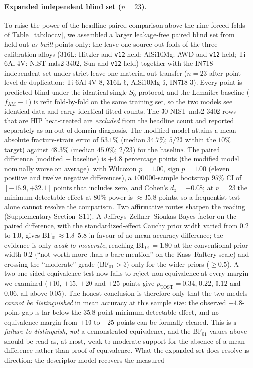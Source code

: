 \documentclass[twocolumn]{sagej}
\begin{document}
\paragraph{Expanded independent blind set ($n = 23$).} To raise the power of the headline paired comparison above the nine forced folds of Table~\ref{tab:loocv}, we assembled a larger leakage-free paired blind set from held-out \emph{as-built} points only: the leave-one-source-out folds of the three calibration alloys (316L: Hitzler and \texttt{v12}-held; AlSi10Mg: AWD and \texttt{v12}-held; Ti-6Al-4V: NIST mds2-3402, Sun and \texttt{v12}-held) together with the IN718 independent set under strict leave-one-material-out transfer ($n = 23$ after point-level de-duplication: Ti-6Al-4V 8, 316L 6, AlSi10Mg 6, IN718 3). Every point is predicted blind under the identical single-$S_0$ protocol, and the Lemaitre baseline ($f_{\mathrm{AM}} \equiv 1$) is refit fold-by-fold on the same training set, so the two models see identical data and carry identical fitted counts. The 30 NIST mds2-3402 rows that are HIP heat-treated are \emph{excluded} from the headline count and reported separately as an out-of-domain diagnosis. The modified model attains a mean absolute fracture-strain error of $53.1\%$ (median $34.7\%$; $5/23$ within the $10\%$ target) against $48.3\%$ (median $45.0\%$; $2/23$) for the baseline. The paired difference (modified $-$ baseline) is $+4.8$ percentage points (the modified model nominally worse on average), with Wilcoxon $p = 1.00$, sign $p = 1.00$ (eleven positive and twelve negative differences), a $100\,000$-sample bootstrap $95\%$ CI of $[-16.9, +32.1]$ points that includes zero, and Cohen's $d_z = +0.08$; at $n = 23$ the minimum detectable effect at $80\%$ power is $\approx 35.8$ points, so a frequentist test alone cannot resolve the comparison. Two affirmative routes sharpen the reading (Supplementary Section~S11). A Jeffreys--Zellner--Sioukas Bayes factor on the paired difference, with the standardized-effect Cauchy prior width varied from $0.2$ to $1.0$, gives $\mathrm{BF}_{01}\approx1.8$--$5.8$ in favour of no mean-accuracy difference; the evidence is only \emph{weak-to-moderate}, reaching $\mathrm{BF}_{01}=1.80$ at the conventional prior width $0.2$ (``not worth more than a bare mention'' on the Kass--Raftery scale) and crossing the ``moderate'' grade ($\mathrm{BF}_{01}>3$) only for the wider priors ($\ge0.5$). A two-one-sided equivalence test now fails to reject non-equivalence at every margin we examined ($\pm10$, $\pm15$, $\pm20$ and $\pm25$ points give $p_{\mathrm{TOST}}=0.34$, $0.22$, $0.12$ and $0.06$, all above $0.05$). The honest conclusion is therefore only that the two models \emph{cannot be distinguished} in mean accuracy at this sample size: the observed $+4.8$-point gap is far below the $35.8$-point minimum detectable effect, and no equivalence margin from $\pm10$ to $\pm25$ points can be formally cleared. This is a \emph{failure to distinguish}, \emph{not} a demonstrated equivalence, and the $\mathrm{BF}_{01}$ values above should be read as, at most, weak-to-moderate support for the absence of a mean difference rather than proof of equivalence. What the expanded set does resolve is direction: the descriptor model recovers the measured 
\end{document}
